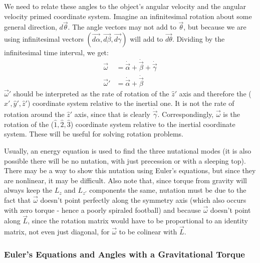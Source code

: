 \documentclass[10pt]{article}
\begin{document}
We need to relate these angles to the object's angular velocity and 
the angular velocity primed coordinate system. Imagine 
an infinitesimal rotation about some general direction, $d\vec\theta$. 
The angle vectors may not add to $\vec{\theta}$, but because we are using
infinitesimal vectors $(\vec{d\alpha},\vec{d\beta},\vec{d\gamma})$ will 
add to $\vec{d\theta}$. Dividing by the infinitesimal time interval, we get:
\begin{align}
    \vec\omega &= \dot{\vec{\alpha}}+\dot{\vec{\beta}}+\dot{\vec{\gamma}} \\
    \vec\omega' &= \dot{\vec{\alpha}}+\dot{\vec{\beta}}
\end{align}
$\vec\omega'$ should be interpreted as the rate of rotation of the 
$\hat{z}'$ axis and therefore the ($\hat{x}',\hat{y}',\hat{z}'$) coordinate 
system relative to the inertial one. It is not the rate of rotation 
around the $\hat{z}'$ axis, since that is clearly 
$\dot{\vec{\gamma}}$. Correspondingly, $\vec{\omega}$ is the rotation 
of the ($\hat1,\hat2,\hat3$) coordinate system relative to the 
inertial coordinate system. These will be useful for solving rotation problems.

Usually, 
an energy equation is used to find the three nutational modes (it is 
also possible there will be no nutation, with just 
precession or with a sleeping top). There may be a way to show this nutation 
using Euler's equations, 
but since they are nonlinear, it may be difficult. Also 
note that, since torque from gravity 
will always keep the $L_z$ and $L_{z'}$ components the same, nutation must 
be due to the fact that $\vec{\omega}$ doesn't point perfectly along the 
symmetry axis (which also occurs with zero torque - hence a poorly spiraled 
football) and
because $\vec{\omega}$ doesn't point along $\vec{L}$, 
since the rotation matrix would have to be proportional to 
an identity matrix, not even 
just diagonal, for $\vec{\omega}$ to be colinear with $\vec{L}$.

\subsubsection{Euler's Equations and Angles with a Gravitational Torque}
\end{document}
